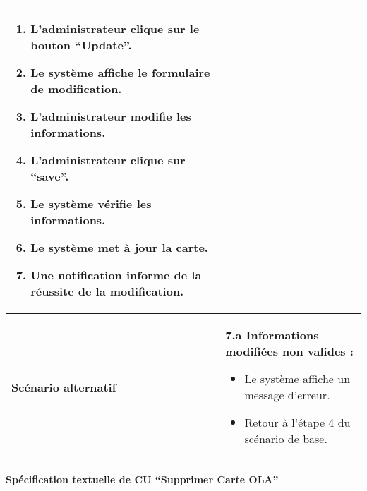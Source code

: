 \documentclass[a4paper,11pt]{report}
\begin{document}
\begin{table}[H]
\begin{tabularx}{\textwidth}{|l|X|}
\begin{enumerate}
      \item L’administrateur clique sur le bouton “Update”.
      \item Le système affiche le formulaire de modification.
      \item L’administrateur modifie les informations.
      \item L’administrateur clique sur “save”.
      \item Le système vérifie les informations.
      \item Le système met à jour la carte.
      \item Une notification informe de la réussite de la modification.
    \end{enumerate} \\ \hline
    \textbf{Scénario alternatif} & 
    \textbf{7.a Informations modifiées non valides :}
    \begin{itemize}
      \item Le système affiche un message d’erreur.
      \item Retour à l’étape 4 du scénario de base.
    \end{itemize} \\ \hline
  \end{tabularx}
\end{table}
\newpage
\textbf{Spécification textuelle de CU “Supprimer Carte OLA”}
\end{document}
